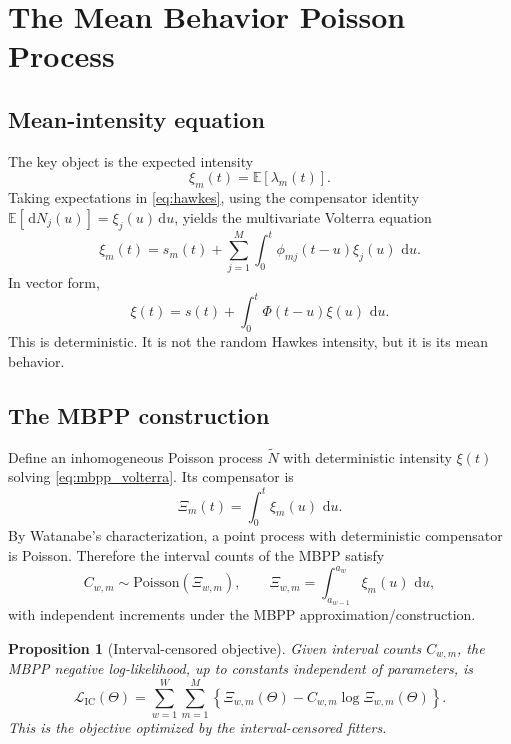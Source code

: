 \documentclass[11pt]{article}
\theoremstyle{plain}
\newtheorem{proposition}{Proposition}[section]
\theoremstyle{definition}
\theoremstyle{remark}
\newcommand{\E}{\mathbb{E}}
\newcommand{\dd}{\,\mathrm{d}}
\begin{document}
\section{The Mean Behavior Poisson Process}
\label{sec:mbpp}

\subsection{Mean-intensity equation}
The key object is the expected intensity
\begin{equation}
\xi_m(t)=\E[\lambda_m(t)].
\end{equation}
Taking expectations in \eqref{eq:hawkes}, using the compensator identity $\E[\dd N_j(u)]=\xi_j(u)\dd u$, yields the multivariate Volterra equation
\begin{equation}
\xi_m(t)=s_m(t)+\sum_{j=1}^{M}\int_0^t \phi_{mj}(t-u)\xi_j(u)\,\dd u.
\label{eq:mbpp_volterra}
\end{equation}
In vector form,
\begin{equation}
\xi(t)=s(t)+\int_0^t \Phi(t-u)\xi(u)\,\dd u.
\end{equation}
This is deterministic. It is not the random Hawkes intensity, but it is its mean behavior.

\subsection{The MBPP construction}
Define an inhomogeneous Poisson process $\widetilde N$ with deterministic intensity $\xi(t)$ solving \eqref{eq:mbpp_volterra}. Its compensator is
\begin{equation}
\Xi_m(t)=\int_0^t \xi_m(u)\,\dd u.
\end{equation}
By Watanabe's characterization, a point process with deterministic compensator is Poisson. Therefore the interval counts of the MBPP satisfy
\begin{equation}
C_{w,m}\sim\mathrm{Poisson}\left(\Xi_{w,m}\right),\qquad
\Xi_{w,m}=\int_{a_{w-1}}^{a_w}\xi_m(u)\,\dd u,
\label{eq:mbpp_counts}
\end{equation}
with independent increments under the MBPP approximation/construction.

\begin{proposition}[Interval-censored objective]
Given interval counts $C_{w,m}$, the MBPP negative log-likelihood, up to constants independent of parameters, is
\begin{equation}
\mathcal L_{\mathrm{IC}}(\Theta)
=\sum_{w=1}^{W}\sum_{m=1}^{M}\left\{\Xi_{w,m}(\Theta)-C_{w,m}\log \Xi_{w,m}(\Theta)\right\}.
\label{eq:icll}
\end{equation}
This is the objective optimized by the interval-censored fitters.
\end{proposition}
\end{document}

